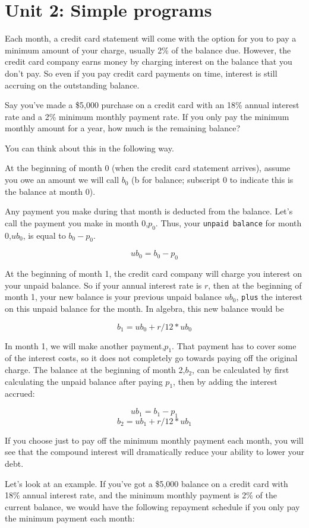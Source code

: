 \documentclass{article}
\begin{document}
\section*{Unit 2: Simple programs}
Each month, a credit card statement will come with the option for you to pay a
minimum amount of your charge, usually 2\% of the balance due. However, the credit
card company earns money by charging interest on the balance that you don't pay.
So even if you pay credit card payments on time, interest is still accruing on
the outstanding balance.

Say you've made a \$5,000 purchase on a credit card with an 18\% annual interest
rate and a 2\% minimum monthly payment rate. If you only pay the minimum monthly
amount for a year, how much is the remaining balance?

You can think about this in the following way.

At the beginning of month 0 (when the credit card statement arrives), assume you
owe an amount we will call $b_0$ (b for balance; subscript 0 to indicate this is the
balance at month 0).

Any payment you make during that month is deducted from the balance. Let's call
the payment you make in month 0,$p_0$. Thus, your \verb|unpaid balance| for month 0,$ub_0$, is
equal to $b_0-p_0$.

\[ub_0 = b_0 - p_0\]

At the beginning of month 1, the credit card company will charge you interest on
your unpaid balance. So if your annual interest rate is $r$, then at the beginning
of month 1, your new balance is your previous unpaid balance $ub_0$, \verb|plus| the interest
on this unpaid balance for the month. In algebra, this new balance would be

\[b_1 = ub_0 + r/12 * ub_0\]

In month 1, we will make another payment,$p_1$. That payment has to cover some of
the interest costs, so it does not completely go towards paying off the original
charge. The balance at the beginning of month 2,$b_2$, can be calculated by first
calculating the unpaid balance after paying $p_1$, then by adding the interest accrued:

\[ub_1 = b_1 - p_1\]
\[b_2 = ub_1 + r/12 * ub_1\]

If you choose just to pay off the minimum monthly payment each month, you will
see that the compound interest will dramatically reduce your ability to lower
your debt.

Let's look at an example. If you've got a \$5,000 balance on a credit card with
18\% annual interest rate, and the minimum monthly payment is 2\% of the current
balance, we would have the following repayment schedule if you only pay the
minimum payment each month:
\end{document}
